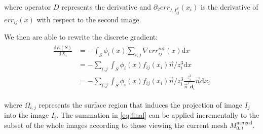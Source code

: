where operator $D$ represents the derivative and $\partial_2 err_{I, I_{ij}^{\mathit{S}}}(x_i)$ is the derivative of $err_{ij}(x)$ with respect to the second image.


We then are able to rewrite the discrete gradient:
\begin{align}
 \begin{split}
\label{eq:final}
  \frac{\textrm{d}E(\mathit{S})}{\textrm{d}X_i} &=  - \int_{\mathit{S}} \phi_i(x) \sum_{i,j} \nabla err^{int}_{ij}(x) \textrm{d}x \\
&=  - \sum_{i,j} \int_{\mathit{S}} \phi_i(x)  f_{ij}(x_i)  \overrightarrow{n}/z_i^3 \textrm{d}x \\
& =  - \sum_{i,j} \int_{\mathit{S}} \phi_i(x)  f_{ij}(x_i)  \overrightarrow{n}/z_i^3 \frac{z_i^3}{\overrightarrow{n}^T \mathbf{d}_i }\overrightarrow{n} \textrm{d}x_i
 \end{split}
\end{align}
% 

where $\Omega_{i,j}$ represents the surface region that induces the projection of image $I_j$ into the image $I_i$.
The summation in \eqref{eq:final} can be applied incrementally to the subset of the whole images according to those viewing the current mesh $M_{0..t}^{\text{merged}}$.

